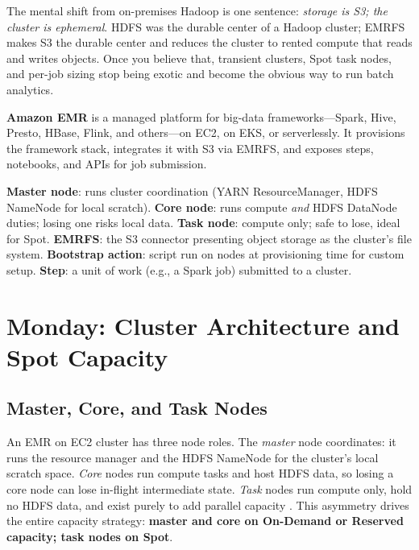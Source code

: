 The mental shift from on-premises Hadoop is one sentence: \emph{storage is S3; the cluster is ephemeral}. HDFS was the durable center of a Hadoop cluster; EMRFS makes S3 the durable center and reduces the cluster to rented compute that reads and writes objects. Once you believe that, transient clusters, Spot task nodes, and per-job sizing stop being exotic and become the obvious way to run batch analytics.

\begin{definitionbox}
\textbf{Amazon EMR} is a managed platform for big-data frameworks---Spark, Hive, Presto, HBase, Flink, and others---on EC2, on EKS, or serverlessly. It provisions the framework stack, integrates it with S3 via EMRFS, and exposes steps, notebooks, and APIs for job submission.
\end{definitionbox}

\begin{keyterms}
\textbf{Master node}: runs cluster coordination (YARN ResourceManager, HDFS NameNode for local scratch). \textbf{Core node}: runs compute \emph{and} HDFS DataNode duties; losing one risks local data. \textbf{Task node}: compute only; safe to lose, ideal for Spot. \textbf{EMRFS}: the S3 connector presenting object storage as the cluster's file system. \textbf{Bootstrap action}: script run on nodes at provisioning time for custom setup. \textbf{Step}: a unit of work (e.g., a Spark job) submitted to a cluster.
\end{keyterms}

\section{Monday: Cluster Architecture and Spot Capacity}
\subsection{Master, Core, and Task Nodes}
An EMR on EC2 cluster has three node roles. The \emph{master} node coordinates: it runs the resource manager and the HDFS NameNode for the cluster's local scratch space. \emph{Core} nodes run compute tasks and host HDFS data, so losing a core node can lose in-flight intermediate state. \emph{Task} nodes run compute only, hold no HDFS data, and exist purely to add parallel capacity \cite{awsEMRDocs}. This asymmetry drives the entire capacity strategy: \textbf{master and core on On-Demand or Reserved capacity; task nodes on Spot}.

